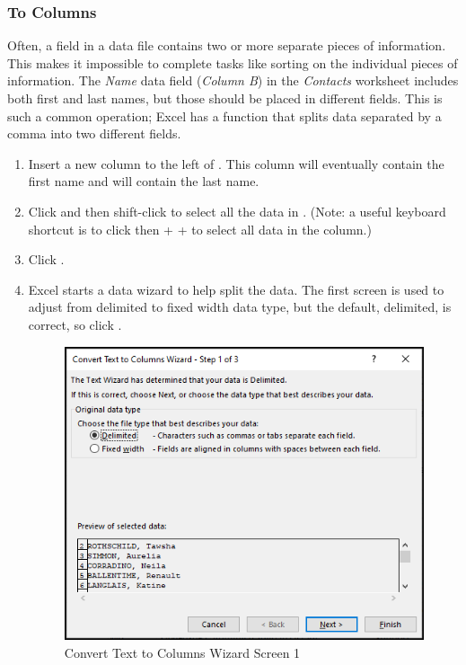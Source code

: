 \subsubsection{To Columns}

Often, a field in a data file contains two or more separate pieces of information. This makes it impossible to complete tasks like sorting on the individual pieces of information. The \textit{Name} data field (\textit{Column B}) in the \textit{Contacts} worksheet includes both first and last names, but those should be placed in different fields. This is such a common operation; Excel has a function that splits data separated by a comma into two different fields.

\begin{enumbox}
	\begin{enumerate}
		\item Insert a new column to the left of . This column will eventually contain the first name and  will contain the last name.
		\item Click  and then shift-click  to select all the data in . (Note: a useful keyboard shortcut is to click  then  +  +  to select all data in the column.)
		\item Click .
		\item Excel starts a data wizard to help split the data. The first screen is used to adjust from delimited to fixed width data type, but the default, delimited, is correct, so click .
		
		\begin{figure}[H]
			\centering
			\includegraphics[width=\maxwidth{.75\linewidth}]{gfx/ch09_fig30}
			\caption{Convert Text to Columns Wizard Screen 1}
			\label{09:fig30}
		\end{figure}
	

\end{enumerate}
\end{enumbox}
